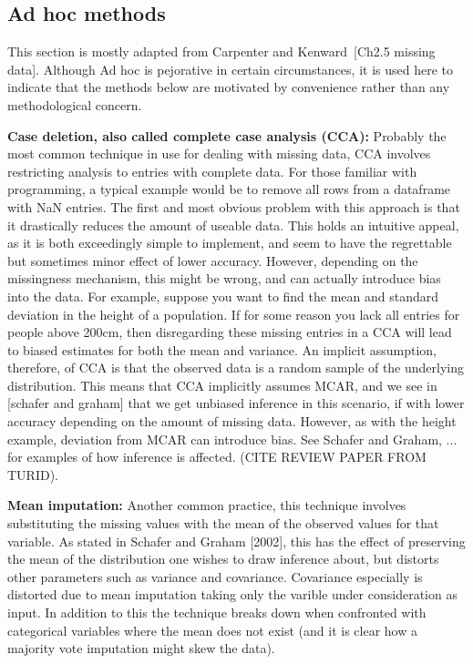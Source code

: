 \documentclass{article}
\begin{document}
	\subsection{Ad hoc methods}
	This section is mostly adapted from Carpenter and Kenward [Ch2.5 missing data]. Although Ad hoc is pejorative in certain circumstances, it is used here to indicate that the methods below are motivated by convenience rather than any methodological concern.
	
	\textbf{Case deletion, also called complete case analysis (CCA):}
	Probably the most common technique in use for dealing with missing data, CCA involves restricting analysis to entries with complete data. For those familiar with programming, a typical example would be to remove all rows from a dataframe with NaN entries. The first and most obvious problem with this approach is that it drastically reduces the amount of useable data. This holds an intuitive appeal, as it is both exceedingly simple to implement, and seem to have the regrettable but sometimes minor effect of lower accuracy. However, depending on the missingness mechanism, this might be wrong, and can actually introduce bias into the data. For example, suppose you want to find the mean and standard deviation in the height of a population. If for some reason you lack all entries for people above 200cm, then disregarding these missing entries in a CCA will lead to biased estimates for both the mean and variance. An implicit assumption, therefore, of CCA is that the observed data is a random sample of the underlying distribution. This means that CCA implicitly assumes MCAR, and we see in [schafer and graham] that we get unbiased inference in this scenario, if with lower accuracy depending on the amount of missing data. However, as with the height example, deviation from MCAR can introduce bias. See Schafer and Graham, ... for examples of how inference is affected. (CITE REVIEW PAPER FROM TURID). 
	
	\textbf{Mean imputation:}
	Another common practice, this technique involves substituting the missing values with the mean of the observed values for that variable. As stated in Schafer and Graham [2002], this has the effect of preserving the mean of the distribution one wishes to draw inference about, but distorts other parameters such as variance and covariance. Covariance especially is distorted due to mean imputation taking only the varible under consideration as input. In addition to this the technique breaks down when confronted with categorical variables where the mean does not exist (and it is clear how a majority vote imputation might skew the data). %
	
\end{document}
